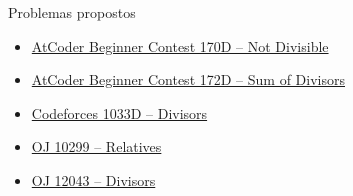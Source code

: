 \begin{frame}[fragile]{Problemas propostos}

    \begin{itemize}
        \item \href{https://atcoder.jp/contests/abc170/tasks/abc170_d}{AtCoder Beginner Contest
            170D -- Not Divisible}

        \item \href{https://atcoder.jp/contests/abc170/tasks/abc172_d}{AtCoder Beginner Contest
            172D -- Sum of Divisors}

        \item \href{https://codeforces.com/problemset/problem/1033/D}{Codeforces 1033D -- Divisors}

        \item \href{http://onlinejudge.org/index.php?option=com_onlinejudge&Itemid=8&category=24&page=show_problem&problem=1240}{OJ 10299 -- Relatives}

        \item \href{http://onlinejudge.org/index.php?option=com_onlinejudge&Itemid=8&category=24&page=show_problem&problem=3194}{OJ 12043 -- Divisors}
    \end{itemize}

\end{frame}
